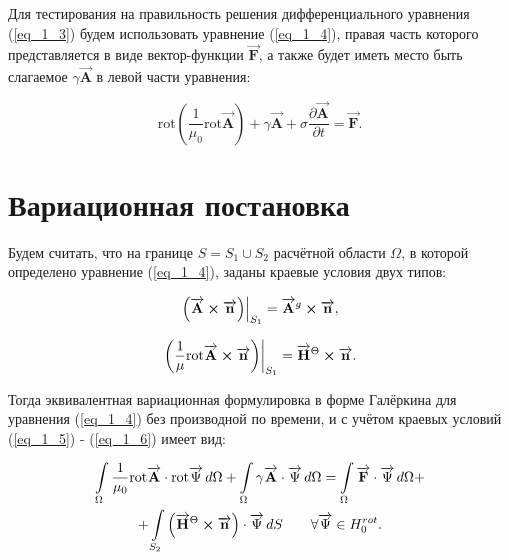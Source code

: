 Для тестирования на правильность решения дифференциального уравнения (\ref{eq_1_3}) будем использовать уравнение (\ref{eq_1_4}), правая часть которого представляется в виде вектор-функции $\overrightarrow{\textbf{F}}$, а также будет иметь место быть слагаемое $\gamma \overrightarrow{\textbf{A}}$ в левой части уравнения:

\begin{equation} \label{eq_1_4}
	\text{rot} \left( \frac{1}{\mu_0} \text{rot} \overrightarrow{\textbf{A}} \right) + \gamma \overrightarrow{\textbf{A}} + \sigma \frac{\partial \overrightarrow{\textbf{A}}}{\partial t} = \overrightarrow{\textbf{F}}.
\end{equation}


\section{Вариационная постановка}

Будем считать, что на границе $S = S_1 \cup S_2$ расчётной области $\Omega$, в которой определено уравнение (\ref{eq_1_4}), заданы краевые условия двух типов:

\begin{equation} \label{eq_1_5}
	\left. \left( \overrightarrow{\textbf{A}} \cross \overrightarrow{\textbf{n}}  \right) \right|_{S_1} = \overrightarrow{\textbf{A}}^g \cross \overrightarrow{\textbf{n}},
\end{equation}

\begin{equation} \label{eq_1_6}
	\left. \left( \frac{1}{\mu} \text{rot} \overrightarrow{\textbf{A}} \cross \overrightarrow{\textbf{n}}  \right) \right|_{S_1} = \overrightarrow{\textbf{H}}^{\Theta} \cross \overrightarrow{\textbf{n}}.
\end{equation}

Тогда эквивалентная вариационная формулировка в форме Галёркина для уравнения (\ref{eq_1_4}) без производной по времени, и с учётом краевых условий (\ref{eq_1_5}) - (\ref{eq_1_6}) имеет вид:

\begin{equation} \label{eq_1_7}
\begin{gathered}
	\int \limits_{\Omega} \frac{1}{\mu_0} \text{rot} \overrightarrow{\textbf{A}} \cdot \text{rot} \overrightarrow{\textbf{$\Psi$}} \, d \Omega + \int \limits_{\Omega} \gamma \overrightarrow{\textbf{A}} \cdot \overrightarrow{\textbf{$\Psi$}} \, d \Omega = \int \limits_{\Omega} \overrightarrow{\textbf{F}} \cdot \overrightarrow{\textbf{$\Psi$}} \, d \Omega + \\ + \int \limits_{S_2} \left( \overrightarrow{\textbf{H}}^{\Theta} \cross \overrightarrow{\textbf{n}} \right) \cdot \overrightarrow{\textbf{$\Psi$}} \, d S \qquad \forall \overrightarrow{\textbf{$\Psi$}} \in H^{rot}_0.
\end{gathered}
\end{equation}


